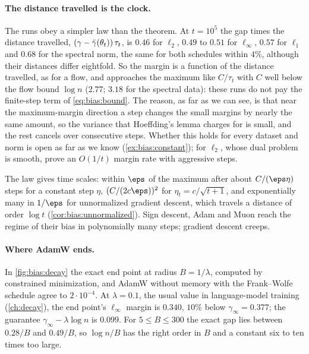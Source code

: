 \begin{refsection}
\paragraph{The distance travelled is the clock.} The runs obey a simpler law than the theorem. At $t=10^5$ the gap times the distance travelled, $(\gamma-\bar\gamma(\theta_t))\,\tau_t$, is $0.46$ for $\ell_2$, $0.49$ to $0.51$ for $\ell_\infty$, $0.57$ for $\ell_1$ and $0.68$ for the spectral norm, the same for both schedules within $4\%$, although their distances differ eightfold. So the margin is a function of the distance travelled, as for a flow, and approaches the maximum like $C/\tau_t$ with $C$ well below the flow bound $\log n$ ($2.77$; $3.18$ for the spectral data): these runs do not pay the finite-step term of \eqref{eq:bias:bound}. The reason, as far as we can see, is that near the maximum-margin direction a step changes the small margins by nearly the same amount, so the variance that Hoeffding's lemma charges for is small, and the rest cancels over consecutive steps. Whether this holds for every dataset and norm is open as far as we know (\cref{ex:bias:constant}); for $\ell_2$, whose dual problem is smooth, \textcite{JiTelgarsky2021} prove an $O(1/t)$ margin rate with aggressive steps.

The law gives time scales: within $\eps$ of the maximum after about $C/(\eps\eta)$ steps for a constant step $\eta$, $(C/(2c\eps))^2$ for $\eta_t=c/\sqrt{t+1}$, and exponentially many in $1/\eps$ for unnormalized gradient descent, which travels a distance of order $\log t$ (\cref{cor:bias:unnormalized}). Sign descent, Adam and Muon reach the regime of their bias in polynomially many steps; gradient descent creeps.

\paragraph{Where AdamW ends.} In \cref{fig:bias:decay} the exact end point at radius $B=1/\lambda$, computed by constrained minimization, and AdamW without memory with the Frank--Wolfe schedule agree to $2\cdot10^{-4}$. At $\lambda=0.1$, the usual value in language-model training (\cref{ch:decay}), the end point's $\ell_\infty$ margin is $0.340$, $10\%$ below $\gamma_\infty=0.377$; the guarantee $\gamma_\infty-\lambda\log n$ is $0.099$. For $5\le B\le300$ the exact gap lies between $0.28/B$ and $0.49/B$, so $\log n/B$ has the right order in $B$ and a constant six to ten times too large.


\end{refsection}

